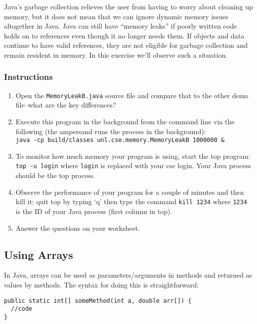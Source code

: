 \documentclass[12pt]{scrartcl}
\begin{document}
Java's garbage collection relieves the user from having to worry about 
cleaning up memory, but it does not mean that we can ignore dynamic 
memory issues altogether in Java.  Java can still have ``memory leaks'' 
if poorly written code holds on to references even though it no longer 
needs them.  If objects and data continue to have valid references, they 
are not eligible for garbage collection and remain resident in memory.  
In this exercise we'll observe such a situation.

\subsubsection*{Instructions}
\begin{enumerate}
  \item Open the \texttt{MemoryLeakB.java} source file and compare 
  	that to the other demo file--what are the key differences?
  \item Execute this program in the background from the command line via the following
	(the ampersand runs the process in the background):\\
	\texttt{java -cp build/classes unl.cse.memory.MemoryLeakB 1000000 &}
  \item To monitor how much memory your program is using, start the top program:
	\texttt{top -u login} where \texttt{login} is replaced with your cse login. 
	Your Java process should be the top process.
  \item Observe the performance of your program for a couple of minutes and then 
	kill it: quit top by typing `q'  then type the command \texttt{kill 1234} 
	where \texttt{1234} is the ID of your Java process (first column in top).
  \item Answer the questions on your worksheet.
\end{enumerate}
	
\subsection{Using Arrays}

In Java, arrays can be used as parameters/arguments in methods and returned 
as values by methods.  The syntax for doing this is straightforward:

\begin{verbatim}
public static int[] someMethod(int a, double arr[]) { 
  //code
}
\end{verbatim}
\end{document}
